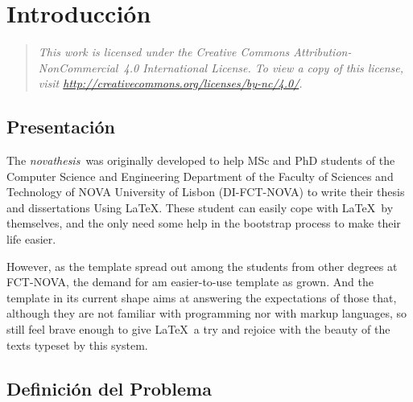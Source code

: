\newcommand{\novathesis}{\emph{novathesis}}
\newcommand{\novathesisclass}{\texttt{novathesis.cls}}


\chapter{Introducción}
\label{cha:Introducción}

\begin{quotation}
  \itshape
  This work is licensed under the Creative Commons Attribution-NonCommercial~4.0 International License.
  To view a copy of this license, visit \url{http://creativecommons.org/licenses/by-nc/4.0/}.
\end{quotation}

\section{Presentación} %
\label{sec:Presentación}

The \novathesis\ was originally developed to help MSc and PhD students of the Computer Science and Engineering Department of the Faculty of Sciences and Technology of NOVA University of Lisbon (DI-FCT-NOVA) to write their thesis and dissertations Using \LaTeX.
%
These student can easily cope with \LaTeX\ by themselves, and the only need some help in the bootstrap process to make their life easier.

However, as the template spread out among the students from other degrees at FCT-NOVA, the demand for am easier-to-use template as grown.
%
And the template in its current shape aims at answering the expectations of those that, although they are not familiar with programming nor with markup languages, so still feel brave enough to give \LaTeX\ a try and rejoice with the beauty of the texts typeset by this system.



\section{Definición del Problema} %
\label{sec:Definición del Problema}

